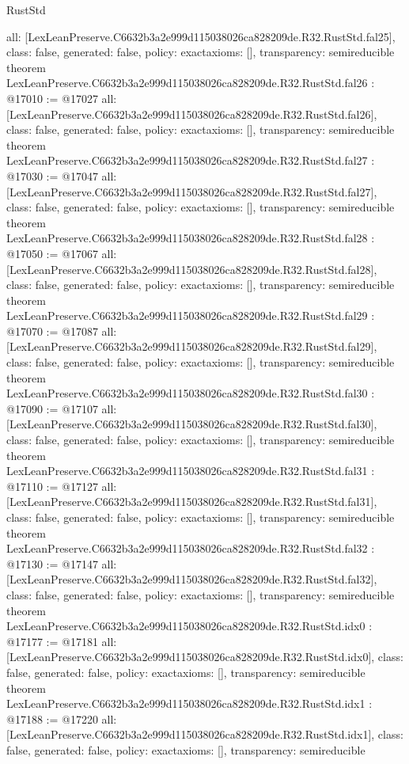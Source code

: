 \begin{lexlean}{RustStd}
\begin{coremodule}
{  all: [LexLeanPreserve.C6632b3a2e999d115038026ca828209de.R32.RustStd.fal25],
  class: false,
  generated: false,
  policy: exact{axioms: []},
  transparency: semireducible
}
theorem LexLeanPreserve.C6632b3a2e999d115038026ca828209de.R32.RustStd.fal26 : @17010 := @17027 {
  all: [LexLeanPreserve.C6632b3a2e999d115038026ca828209de.R32.RustStd.fal26],
  class: false,
  generated: false,
  policy: exact{axioms: []},
  transparency: semireducible
}
theorem LexLeanPreserve.C6632b3a2e999d115038026ca828209de.R32.RustStd.fal27 : @17030 := @17047 {
  all: [LexLeanPreserve.C6632b3a2e999d115038026ca828209de.R32.RustStd.fal27],
  class: false,
  generated: false,
  policy: exact{axioms: []},
  transparency: semireducible
}
theorem LexLeanPreserve.C6632b3a2e999d115038026ca828209de.R32.RustStd.fal28 : @17050 := @17067 {
  all: [LexLeanPreserve.C6632b3a2e999d115038026ca828209de.R32.RustStd.fal28],
  class: false,
  generated: false,
  policy: exact{axioms: []},
  transparency: semireducible
}
theorem LexLeanPreserve.C6632b3a2e999d115038026ca828209de.R32.RustStd.fal29 : @17070 := @17087 {
  all: [LexLeanPreserve.C6632b3a2e999d115038026ca828209de.R32.RustStd.fal29],
  class: false,
  generated: false,
  policy: exact{axioms: []},
  transparency: semireducible
}
theorem LexLeanPreserve.C6632b3a2e999d115038026ca828209de.R32.RustStd.fal30 : @17090 := @17107 {
  all: [LexLeanPreserve.C6632b3a2e999d115038026ca828209de.R32.RustStd.fal30],
  class: false,
  generated: false,
  policy: exact{axioms: []},
  transparency: semireducible
}
theorem LexLeanPreserve.C6632b3a2e999d115038026ca828209de.R32.RustStd.fal31 : @17110 := @17127 {
  all: [LexLeanPreserve.C6632b3a2e999d115038026ca828209de.R32.RustStd.fal31],
  class: false,
  generated: false,
  policy: exact{axioms: []},
  transparency: semireducible
}
theorem LexLeanPreserve.C6632b3a2e999d115038026ca828209de.R32.RustStd.fal32 : @17130 := @17147 {
  all: [LexLeanPreserve.C6632b3a2e999d115038026ca828209de.R32.RustStd.fal32],
  class: false,
  generated: false,
  policy: exact{axioms: []},
  transparency: semireducible
}
theorem LexLeanPreserve.C6632b3a2e999d115038026ca828209de.R32.RustStd.idx0 : @17177 := @17181 {
  all: [LexLeanPreserve.C6632b3a2e999d115038026ca828209de.R32.RustStd.idx0],
  class: false,
  generated: false,
  policy: exact{axioms: []},
  transparency: semireducible
}
theorem LexLeanPreserve.C6632b3a2e999d115038026ca828209de.R32.RustStd.idx1 : @17188 := @17220 {
  all: [LexLeanPreserve.C6632b3a2e999d115038026ca828209de.R32.RustStd.idx1],
  class: false,
  generated: false,
  policy: exact{axioms: []},
  transparency: semireducible
}
\end{coremodule}
\end{lexlean}

